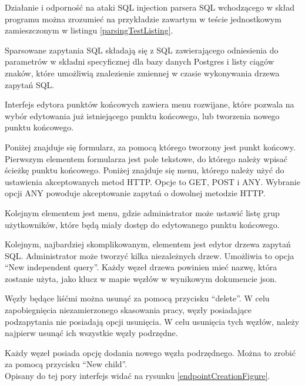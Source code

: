 Działanie i odporność na ataki SQL injection parsera SQL wchodzącego w skład
programu można zrozumieć na przykładzie zawartym w teście jednostkowym
zamieszczonym w listingu \ref{parsingTestListing}.

Sparsowane zapytania SQL składają się z SQL zawierającego odniesienia do
parametrów w składni specyficznej dla bazy danych Postgres
\cite{PostgresPrepareStatement} i listy ciągów znaków, które umożliwią
znalezienie zmiennej w czasie wykonywania drzewa zapytań SQL.



Interfejs edytora punktów końcowych zawiera menu rozwijane, które pozwala na
wybór edytowania już istniejącego punktu końcowego, lub tworzenia nowego punktu
końcowego.

Poniżej znajduje się formularz, za pomocą którego tworzony jest punkt końcowy.
Pierwszym elementem formularza jest pole tekstowe, do którego należy wpisać
ścieżkę punktu końcowego. Poniżej znajduje się menu, którego należy użyć do
ustawienia akceptowanych metod HTTP. Opcje to GET, POST i ANY. Wybranie opcji
ANY powoduje akceptowanie zapytań o dowolnej metodzie HTTP.

Kolejnym elementem jest menu, gdzie administrator może ustawić listę grup
użytkowników, które będą miały dostęp do edytowanego punktu końcowego.

Kolejnym, najbardziej skomplikowanym, elementem jest edytor drzewa zapytań SQL.
Administrator może tworzyć kilka niezależnych drzew. Umożliwia to opcja ``New
independent query''. Każdy węzeł drzewa powinien mieć nazwę, która zostanie
użyta, jako klucz w mapie węzłów w wynikowym dokumencie json.

Węzły będące liśćmi można usunąć za pomocą przycisku ``delete''. W celu
zapobiegnięcia niezamierzonego skasowania pracy, węzły posiadające podzapytania
nie posiadają opcji usunięcia. W celu usunięcia tych węzłów, należy najpierw
usunąć ich wszystkie węzły podrzędne.

Każdy węzeł posiada opcję dodania nowego węzła podrzędnego. Można to zrobić za
pomocą przycisku ``New child''.\\

Opisany do tej pory interfejs widać na rysunku \ref{endpointCreationFigure}.\\

